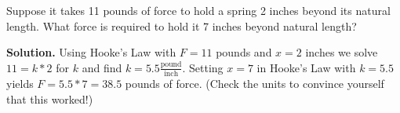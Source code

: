 \documentclass{ximera}
\begin{document}
\medskip

\begin{example} \label{findingkinvariation} Suppose it takes 11 pounds of force to hold a spring 2 inches beyond its natural length.  What force is required to hold it 7 inches beyond natural length?

\smallskip

{\bf Solution.}  Using Hooke's Law with $F = 11$ pounds and $x = 2$ inches we solve $11 = k*2$ for $k$ and find $k = 5.5 \frac{\text{pound}}{\text{inch}}$.  Setting $x = 7$ in Hooke's Law with $k = 5.5$ yields $F = 5.5*7 = 38.5$ pounds of force.  (Check the units to convince yourself that this worked!)

\end{example}



\closegraphsfile
\end{document}
